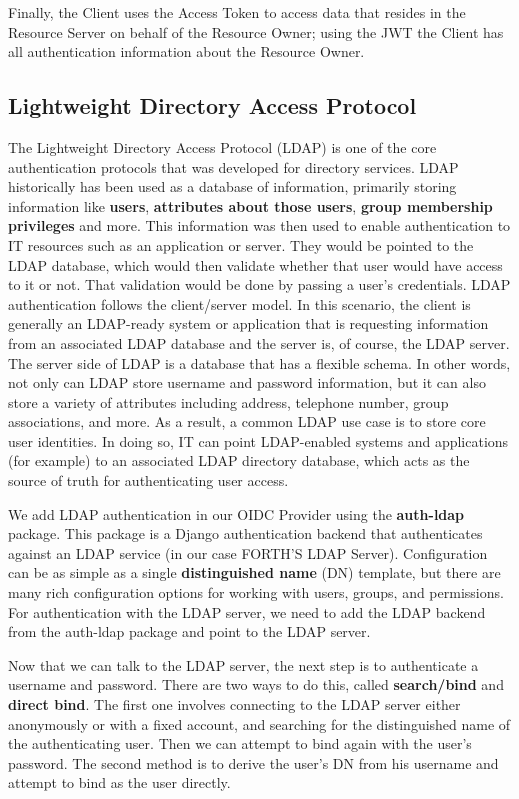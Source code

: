 Finally, the Client uses the Access Token to access data that resides in the Resource Server on behalf of the Resource Owner; using the JWT the Client has all authentication information about the Resource Owner.


\subsection{Lightweight Directory Access Protocol}

The Lightweight Directory Access Protocol (LDAP) is one of the core authentication protocols that was developed for directory services. LDAP historically has been used as a database of information, primarily storing information like \textbf{users}, \textbf{attributes about those users}, \textbf{group membership privileges} and more. This information was then used to enable authentication to IT resources such as an application or server. They would be pointed to the LDAP database, which would then validate whether that user would have access to it or not. That validation would be done by passing a user’s credentials. LDAP authentication follows the client/server model. In this scenario, the client is generally an LDAP-ready system or application that is requesting information from an associated LDAP database and the server is, of course, the LDAP server. The server side of LDAP is a database that has a flexible schema. In other words, not only can LDAP store username and password information, but it can also store a variety of attributes including address, telephone number, group associations, and more. As a result, a common LDAP use case is to store core user identities. In doing so, IT can point LDAP-enabled systems and applications (for example) to an associated LDAP directory database, which acts as the source of truth for authenticating user access.

We add LDAP authentication in our OIDC Provider using the \textbf{auth-ldap} \cite{ldapauth} package. This package is a Django authentication backend that authenticates against an LDAP service (in our case FORTH'S LDAP Server). Configuration can be as simple as a single \textbf{distinguished name} (DN) template, but there are many rich configuration options for working with users, groups, and permissions. For authentication with the LDAP server, we need to add the LDAP backend from the auth-ldap package and point to the LDAP server.

Now that we can talk to the LDAP server, the next step is to authenticate a username and password. There are two ways to do this, called \textbf{search/bind} and \textbf{direct bind}. The first one involves connecting to the LDAP server either anonymously or with a fixed account, and searching for the distinguished name of the authenticating user. Then we can attempt to bind again with the user’s password. The second method is to derive the user’s DN from his username and attempt to bind as the user directly.

